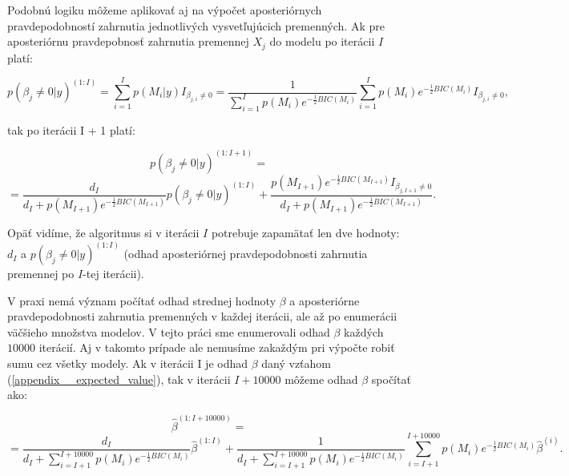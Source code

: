 Podobnú logiku môžeme aplikovať aj na výpočet aposteriórnych pravdepodobností zahrnutia jednotlivých vysvetľujúcich premenných.
Ak pre aposteriórnu pravdepobnosť zahrnutia premennej \(X_j\) do modelu po iterácii \(I\) platí:

\[
    p(\beta_j \neq 0 | y)^{(1:I)} = \sum_{i = 1}^{I} p(M_i | y) I_{\beta_{j, i} \neq 0} = \frac{1}{\sum_{i = 1}^{I} p(M_i) e^{-\frac{1}{2}BIC(M_i)}} \sum_{i = 1}^{I} p(M_i) e^{-\frac{1}{2}BIC(M_i)} I_{\beta_{j, i} \neq 0},
\]

tak po iterácii I + 1 platí:

\[
    p(\beta_j \neq 0 | y)^{(1:I + 1)} =
\]
\[
    = \frac{d_I}{d_I + p(M_{I + 1}) e^{-\frac{1}{2}BIC(M_{I + 1})}} p(\beta_j \neq 0 | y)^{(1:I)} + \frac{p(M_{I + 1}) e^{-\frac{1}{2}BIC(M_{I + 1})} I_{\beta_{j, I + 1} \neq 0}}{d_I + p(M_{I + 1}) e^{-\frac{1}{2}BIC(M_{I + 1})}}.
\]

Opäť vidíme, že algoritmus si v iterácii \(I\) potrebuje zapamätať len dve hodnoty: \(d_I\) a \( p(\beta_j \neq 0 | y)^{(1:I)} \)
(odhad aposteriórnej pravdepodobnosti zahrnutia premennej po \(I\)-tej iterácii).

V praxi nemá význam počítať odhad strednej hodnoty \(\beta\) a aposteriórne pravdepodobnosti zahrnutia premenných v každej iterácii, ale až po enumerácii väčšieho množstva modelov.
V tejto práci sme enumerovali odhad \(\beta\) každých \(10000\) iterácií.
Aj v takomto prípade ale nemusíme zakaždým pri výpočte robiť sumu cez všetky modely.
Ak v iterácii I je odhad \(\beta\) daný vzťahom (\ref{appendix__expected_value}), tak v iterácii \(I + 10000\) môžeme odhad \(\beta\) spočítať ako:

\[
    \hat{\beta}^{(1:I + 10000)} =
\]
\[
    = \frac{d_I}{d_I + \sum_{i = I + 1}^{I + 10000} p(M_i) e^{-\frac{1}{2}BIC(M_i)}} \hat{\beta}^{(1:I)} + \frac{1}{d_I + \sum_{i = I + 1}^{I + 10000} p(M_i) e^{-\frac{1}{2}BIC(M_i)}} \sum_{i = I + 1}^{I + 10000} p(M_i) e^{-\frac{1}{2}BIC(M_i)} \hat{\beta}^{(i)}.
\]